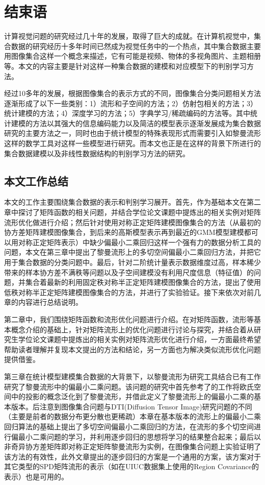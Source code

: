 \chapter{结束语}
\label{chap:The_End}
计算视觉问题的研究经过几十年的发展，取得了巨大的成就。在计算机视觉中，集合数据的研究经历十多年时间已然成为视觉任务中的一个热点，其中集合数据主要用图像集合这样一个概念来描述，它有可能是视频、物体的多视角图片、主题相册等。本文的内容主要是针对这样一种集合数据的建模和对应模型下的判别学习方法。

经过10多年的发展，根据图像集合的表示方式的不同，图像集合分类问题相关方法逐渐形成了以下一些类别：1）流形和子空间的方法；2）仿射包相关的方法；3）统计建模的方法；4）深度学习的方法；5）字典学习/稀疏编码的方法等。其中统计建模的方法以其强大的信息编码能力以及简洁的模型表示逐渐发展成为集合数据研究的主要方法之一，同时也由于统计模型的特殊表现形式而需要引入如黎曼流形这样的数学工具对这样一些模型进行研究。而本文也正是在这样的背景下所进行的集合数据建模以及非线性数据结构的判别学习方法的研究。
\section{本文工作总结}
\label{sec:Conclusion}
本文的工作主要围绕集合数据的表示和判别学习展开。首先，作为基础本文在第二章中探讨了矩阵函数的相关问题，并结合学位论文课题中提炼出的相关实例对矩阵流形优化做进行介绍；然后针对使用对称正定矩阵建模图像集合的方法（从最初的协方差矩阵建模图像集合，到后来的高斯模型表示再到最近的GMM模型建模都可以用对称正定矩阵表示）中缺少偏最小二乘回归这样一个强有力的数据分析工具的问题，本文在第三章中提出了黎曼流形上的多切空间偏最小二乘回归方法，并把它用于集合数据的分类问题中。最后，针对二阶统计量表示数据维度过高，样本稀少带来的样本协方差不满秩等问题以及子空间建模没有利用尺度信息（特征值）的问题，并集合着最新的利用固定秩对称半正定矩阵建模图像集合的方法，提出了使用低秩对称半正定矩阵建模图像集合的方法，并进行了实验验证。接下来依次对前几章的内容进行总结说明。

第二章中，我们围绕矩阵函数和流形优化问题进行介绍。在对矩阵函数，流形等基本概念介绍的基础上，针对矩阵流形上的优化问题进行讨论与探究，并结合着从研究生学位论文课题中提炼出的相关实例对矩阵流形优化进行介绍，一方面最终希望帮助读者理解并复现本文提出的方法和结论，另一方面也为解决类似流形优化问题提供借鉴。

第三章在统计模型建模集合数据的大背景下，以黎曼流形为研究工具结合已有工作\cite{PGA,RCCA}研究了黎曼流形中的偏最小二乘问题。该问题的研究中首先参考了\cite{PGA,RCCA}的工作将欧氏空间中的投影的概念泛化到了黎曼流形，并借此定义了黎曼流形上的偏最小二乘的基本版本。后注意到图像集合问题与DTI(Diffusion Tensor Image)研究问题的不同（主要是前者的数据分布更分散也更稀疏）本章在基本版本的流形上的偏最小二乘回归算法的基础上提出了多切空间偏最小二乘回归的方法，在流形的多个切空间进行偏最小二乘问题的学习，并利用逐步回归的思想将学习的结果整合起来；最后以非奇异协方差矩阵即对称正定矩阵黎曼流形为实例，在图像集合问题上实验证明了该方法的有效性，此外文章提出的逐步回归的方案是一个通用的方案，该方案对于其它类型的SPD矩阵流形的表示（如在UIUC\cite{Database_UIUC}数据集上使用的Region Covariance的表示）也是可用的。

